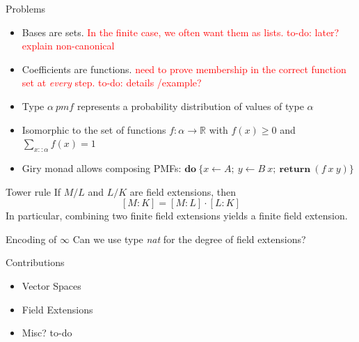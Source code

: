 \documentclass[%
	sans,
	12pt,
]{beamer}
\newcommand{\bad}[1]{\textcolor{red}{#1}}
\begin{document}
\begin{frame}{Problems}
\begin{itemize}
\item Bases are sets.
\bad{In the finite case, we often want them as lists. to-do: later? explain non-canonical}
\item Coefficients are functions.
\bad{need to prove membership in the correct function set at \emph{every} step.
	 to-do: details /example?}
\end{itemize}
\begin{itemize}
\item Type $\alpha\ \textit{pmf}$ represents a probability distribution of values of type $\alpha$\pause
\item Isomorphic to the set of functions $f : \alpha\to\mathbb{R}$ with $f(x) \geq 0$ and $\sum_{x :: \alpha} f(x) = 1$\pause
\item Giry monad allows composing PMFs: $\textbf{do}\ \{x\leftarrow A;\ y \leftarrow B\ x;\ \textbf{return}\ (f\ x\ y)\}$
\end{itemize}
\end{frame}

\begin{frame}{Tower rule}
If $M/L$ and $L/K$ are field extensions, then
\[[M : K] = [M : L] \cdot [L : K]\]\pause %
In particular, combining two finite field extensions yields a finite field extension. %
\end{frame}

\begin{frame}{Encoding of $\infty$}
Can we use type \emph{nat} for the degree of field extensions?\pause
{}
\end{frame}

\begin{frame}{Contributions}
\begin{itemize}
	\item Vector Spaces\pause
	\item Field Extensions\pause
	\item Misc? to-do
\end{itemize}
\end{frame}
\end{document}
